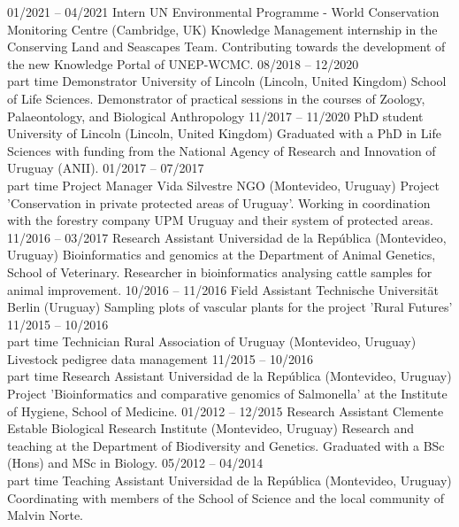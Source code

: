 \documentclass[9pt]{developercv} %
\begin{document}
\begin{entrylist}
	\entry
		{01/2021 -- 04/2021}
		{Intern}
		{UN Environmental Programme - World Conservation Monitoring Centre (Cambridge, UK)}
		{Knowledge Management internship in the Conserving Land and Seascapes Team. Contributing towards the development of the new Knowledge Portal of UNEP-WCMC.}
	\entry
		{08/2018 -- 12/2020\\\footnotesize{part time}}
		{Demonstrator}
		{University of Lincoln (Lincoln, United Kingdom)}
		{School of Life Sciences. Demonstrator of practical sessions in the courses of Zoology, Palaeontology, and Biological Anthropology}
	\entry
		{11/2017 -- 11/2020}
		{PhD student}
		{University of Lincoln (Lincoln, United Kingdom)}
		{Graduated with a PhD in Life Sciences with funding from the National Agency of Research and Innovation of Uruguay (ANII).}
	\entry
		{01/2017 -- 07/2017\\\footnotesize{part time}}
		{Project Manager}
		{Vida Silvestre NGO (Montevideo, Uruguay)}
		{Project ’Conservation in private protected areas of Uruguay’. Working in coordination with the forestry company UPM Uruguay and their system of protected areas.}
	\entry
		{11/2016 -- 03/2017}
		{Research Assistant}
		{Universidad de la Rep\'{u}blica (Montevideo, Uruguay)}
		{Bioinformatics and genomics at the Department of Animal Genetics, School of Veterinary. Researcher in bioinformatics analysing cattle samples for animal improvement.}
	\entry
		{10/2016 -- 11/2016}
		{Field Assistant}
		{Technische Universität Berlin (Uruguay)}
		{Sampling plots of vascular plants for the project 'Rural Futures'}
	\entry
		{11/2015 -- 10/2016\\\footnotesize{part time}}
		{Technician}
		{Rural Association of Uruguay (Montevideo, Uruguay)}
		{Livestock pedigree data management}
	\entry
		{11/2015 -- 10/2016\\\footnotesize{part time}}
		{Research Assistant}
		{Universidad de la Rep\'{u}blica (Montevideo, Uruguay)}
		{Project 'Bioinformatics and comparative genomics of Salmonella' at the Institute of Hygiene, School of Medicine.}
	\entry
		{01/2012 -- 12/2015}
		{Research Assistant}
		{Clemente Estable Biological Research Institute (Montevideo, Uruguay)}
		{Research and teaching at the Department of Biodiversity and Genetics. Graduated with a BSc (Hons) and MSc in Biology.}
	\entry
		{05/2012 -- 04/2014\\\footnotesize{part time}}
		{Teaching Assistant}
		{Universidad de la Rep\'{u}blica (Montevideo, Uruguay)}
		{Coordinating with members of the School of Science and the local community of Malvin Norte.}
\end{entrylist}
\end{document}
